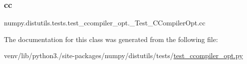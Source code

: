 \subsubsection{\texorpdfstring{cc}{cc}}
{\footnotesize\ttfamily numpy.\+distutils.\+tests.\+test\+\_\+ccompiler\+\_\+opt.\+\_\+\+Test\+\_\+\+C\+Compiler\+Opt.\+cc\hspace{0.3cm}{\ttfamily [static]}}



The documentation for this class was generated from the following file\+:\begin{DoxyCompactItemize}
\item 
venv/lib/python3./site-\/packages/numpy/distutils/tests/\hyperlink{test__ccompiler__opt_8py}{test\+\_\+ccompiler\+\_\+opt.\+py}\end{DoxyCompactItemize}
